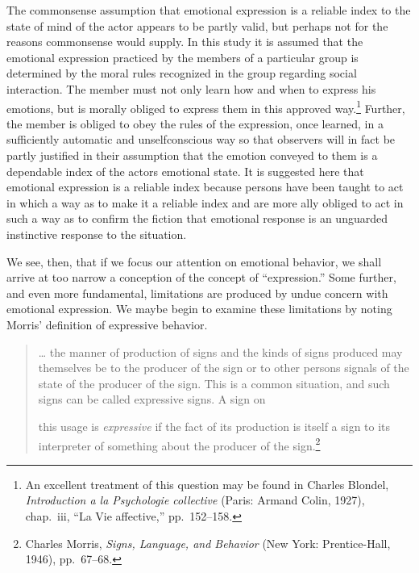 \documentclass[openany,nobib]{tufte-book}
\begin{document}
The commonsense assumption that emotional expression is a reliable index
to the state of mind of the actor appears to be partly valid, but
perhaps not for the reasons commonsense would supply. In this study it
is assumed that the emotional expression practiced by the members of a
particular group is determined by the moral rules recognized in the
group regarding social interaction. The member must not only learn how
and when to express his emotions, but is morally obliged to express them
in this approved way.\footnote{An excellent treatment of this question
  may be found in Charles Blondel, \emph{Introduction a la Psychologie
  collective} (Paris: Armand Colin, 1927), chap.~iii, ``La Vie
  affective,'' pp.~152--158.} Further, the member is obliged to obey the
rules of the expression, once learned, in a sufficiently automatic and
unselfconscious way so that observers will in fact be partly justified
in their assumption that the emotion conveyed to them is a dependable
index of the actors emotional state. It is suggested here that emotional
expression is a reliable index because persons have been taught to act
in which a way as to make it a reliable index and are more ally obliged
to act in such a way as to confirm the fiction that emotional response
is an unguarded instinctive response to the situation.

We see, then, that if we focus our attention on emotional behavior, we
shall arrive at too narrow a conception of the concept of
``expression.'' Some further, and even more fundamental, limitations are
produced by undue concern with emotional expression. We maybe begin to
examine these limitations by noting Morris' definition of expressive
behavior.

\begin{quote}
\ldots{} the manner of production of signs and the kinds of signs
produced may themselves be to the producer of the sign or to other
persons signals of the state of the producer of the sign. This is a
common situation, and such signs can be called expressive signs. A sign
on

\newpage this usage is \emph{expressive} if the fact of its production is
itself a sign to its interpreter of something about the producer of the
sign.\footnote{Charles Morris, \emph{Signs, Language, and Behavior} (New
  York: Prentice-Hall, 1946), pp.~67--68.}
\end{quote}
\end{document}
